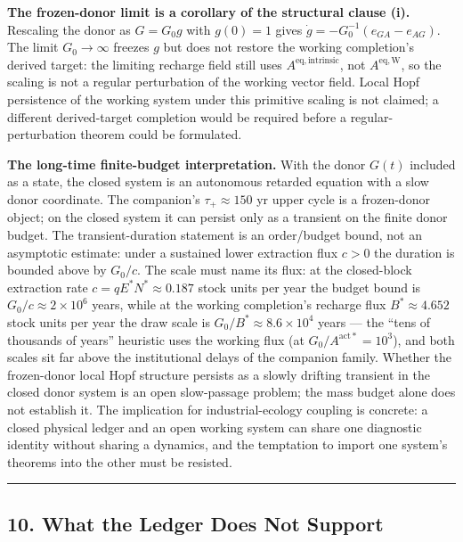 \documentclass[11pt]{article}
\begin{document}
\textbf{The frozen-donor limit is a corollary of the structural clause
(i).} Rescaling the donor as \(G = G_0 g\) with \(g(0) = 1\) gives
\(\dot g = -G_0^{-1}(e_{GA} - e_{AG})\). The limit \(G_0 \to \infty\)
freezes \(g\) but does not restore the working completion's derived
target: the limiting recharge field still uses
\(A^{\mathrm{eq,intrinsic}}\), not \(A^{\mathrm{eq,W}}\), so the scaling
is not a regular perturbation of the working vector field. Local Hopf
persistence of the working system under this primitive scaling is not
claimed; a different derived-target completion would be required before
a regular-perturbation theorem could be formulated.

\textbf{The long-time finite-budget interpretation.} With the donor
\(G(t)\) included as a state, the closed system is an autonomous
retarded equation with a slow donor coordinate. The companion's
\(\tau_+ \approx 150\) yr upper cycle is a frozen-donor object; on the
closed system it can persist only as a transient on the finite donor
budget. The transient-duration statement is an order/budget bound, not
an asymptotic estimate: under a sustained lower extraction flux
\(c > 0\) the duration is bounded above by \(G_0/c\). The scale must
name its flux: at the closed-block extraction rate
\(c = qE^*N^* \approx 0.187\) stock units per year the budget bound is
\(G_0/c \approx 2 \times 10^6\) years, while at the working completion's
recharge flux \(B^* \approx 4.652\) stock units per year the draw scale
is \(G_0/B^* \approx 8.6 \times 10^4\) years --- the ``tens of thousands
of years'' heuristic uses the working flux (at
\(G_0/A^{\mathrm{act}*} = 10^3\)), and both scales sit far above the
institutional delays of the companion family. Whether the frozen-donor
local Hopf structure persists as a slowly drifting transient in the
closed donor system is an open slow-passage problem; the mass budget
alone does not establish it. The implication for industrial-ecology
coupling is concrete: a closed physical ledger and an open working
system can share one diagnostic identity without sharing a dynamics, and
the temptation to import one system's theorems into the other must be
resisted.

\begin{center}\rule{0.5\linewidth}{0.5pt}\end{center}

\subsection{10. What the Ledger Does Not
Support}\label{what-the-ledger-does-not-support}
\end{document}
